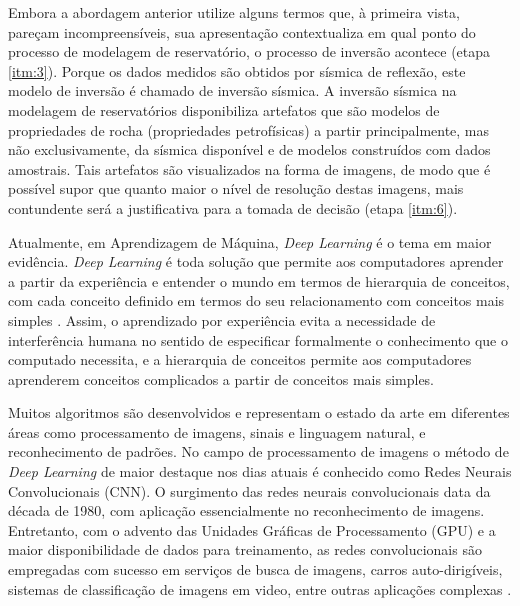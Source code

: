Embora a abordagem anterior utilize alguns termos que, à primeira vista, pareçam incompreensíveis,
sua apresentação contextualiza em qual ponto do processo de modelagem de
reservatório, o processo de inversão acontece (etapa \ref{itm:3}).
Porque os dados medidos são obtidos por sísmica de reflexão,
este modelo de inversão é chamado de inversão sísmica. A inversão sísmica na
modelagem de reservatórios disponibiliza artefatos que são modelos de propriedades de rocha
(propriedades petrofísicas) a partir principalmente, mas não exclusivamente,
da sísmica disponível e de modelos construídos com dados amostrais. Tais artefatos
são visualizados na forma de imagens, de modo que é possível supor que quanto maior
o nível de resolução destas imagens, mais contundente será a justificativa para a tomada de decisão
(etapa \ref{itm:6}).

Atualmente, em Aprendizagem de Máquina, \textit{Deep Learning} é o tema em
maior evidência. \textit{Deep Learning} é toda solução que permite aos
computadores aprender a partir da experiência e entender o mundo em
termos de hierarquia de conceitos, com cada conceito definido em termos
do seu relacionamento com conceitos mais simples \cite{Gdfl16}.
Assim, o aprendizado por experiência evita a necessidade de interferência
humana no sentido de especificar formalmente o conhecimento que o computado necessita,
e a hierarquia de conceitos permite aos computadores aprenderem
conceitos complicados a partir de conceitos mais simples.

Muitos algoritmos são desenvolvidos e representam
o estado da arte em diferentes áreas como processamento de imagens, 
sinais e linguagem natural, e reconhecimento de padrões. No campo de
processamento de imagens o método de \textit{Deep Learning} de
maior destaque nos dias atuais é conhecido
como Redes Neurais Convolucionais (CNN). O surgimento das redes neurais convolucionais
data da década de 1980, com aplicação essencialmente no reconhecimento de imagens.
Entretanto, com o advento das Unidades Gráficas de Processamento (GPU) e a maior
disponibilidade de dados para treinamento, as redes convolucionais
são empregadas com sucesso em serviços de busca de imagens, carros auto-dirigíveis,
sistemas de classificação de imagens em video, entre outras aplicações complexas \cite[p. 50]{Buduma15}.

